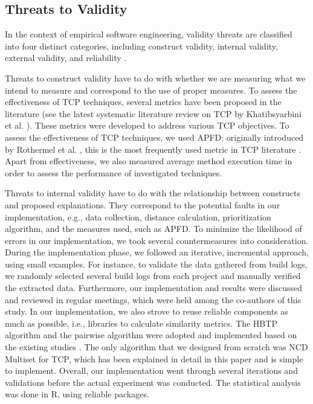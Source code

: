 \documentclass[1p]{elsarticle}
\begin{document}
\subsection{Threats to Validity}

In the context of empirical software engineering, validity threats are classified into four distinct categories, including construct validity, internal validity, external validity, and reliability \citep{wohlin2000experimentation}.

Threats to construct validity have to do with whether we are measuring what we intend to measure and correspond to the use of proper measures. To assess the effectiveness of TCP techniques, several metrics have been proposed in the literature (see the latest systematic literature review on TCP by Khatibsyarbini et al. \cite{khatibsyarbini2017test}). These metrics were developed to address various TCP objectives. To assess the effectiveness of TCP techniques, we used APFD; originally introduced by Rothermel et al. \cite{rothermel2001prioritizing}, this is the most frequently used metric in TCP literature \cite{khatibsyarbini2017test}. Apart from effectiveness, we also measured average method execution time in order to assess the performance of investigated techniques.

Threats to internal validity have to do with the relationship between constructs and proposed explanations. They correspond to the potential faults in our implementation, e.g., data collection, distance calculation, prioritization algorithm, and the measures used, such as APFD. To minimize the likelihood of errors in our implementation, we took several countermeasures into consideration. During the implementation phase, we followed an iterative, incremental approach, using small examples. For instance, to validate the data gathered from build logs, we randomly selected several build logs from each project and manually verified the extracted data. Furthermore, our implementation and results were discussed and reviewed in regular meetings, which were held among the co-authors of this study. In our implementation, we also strove to reuse reliable components as much as possible, i.e., libraries to calculate similarity metrics. The HBTP algorithm and the pairwise algorithm were adopted and implemented based on the existing studies \cite{hemmati2017prioritizing,ledru2012prioritizing}. The only algorithm that we designed from scratch was NCD Multiset for TCP, which has been explained in detail in this paper and is simple to implement. Overall, our implementation went through several iterations and validations before the actual experiment was conducted. The statistical analysis was done in R, using reliable packages.
\end{document}

